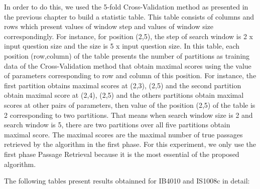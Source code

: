 In order to do this, we used the 5-fold Cross-Validation method as presented in the previous chapter to build a statistic table. This table consists of columns and rows which present values of window step and values of window size correspondingly. For instance, for position (2,5), the step of search window is 2 x input question size and the size is 5 x input question size. In this table, each position (row,column) of the table presents the number of partitions as training data of the Cross-Validation method that obtain maximal scores using the value of parameters corresponding to row and column of this position. For instance, the first partition obtains maximal scores at (2,3), (2,5) and the second partition obtain maximal score at (2,4), (2,5) and the others partitions obtain maximal scores at other pairs of parameters, then value of the position (2,5) of the table is 2 corresponding to two partitions. That means when search window size is 2 and search window is 5, there are two partitions over all five partitions obtain maximal score. The maximal scores are the maximal number of true passages retrieved by the algorithm in the first phase. For this experiment, we only use the first phase Passage Retrieval because it is the most essential of the proposed algorithm.

The following tables present results obtainned for IB4010 and IS1008c in detail:



